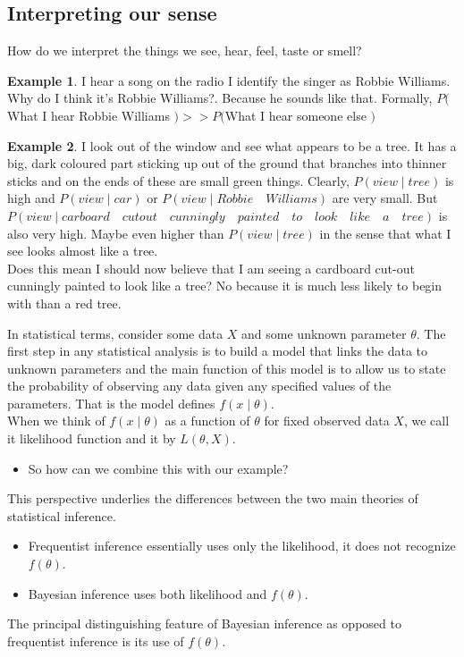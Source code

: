 \documentclass[lecture,12pt,]{pcms-l}
\numberwithin{section}{chapter}
\numberwithin{equation}{chapter}
\theoremstyle{plain}
\theoremstyle{definition}
\newtheorem{example}{Example}[section]
\theoremstyle{definition}
\begin{document}
\subsection{Interpreting our sense} 
How do we interpret the things we see, hear, feel, taste or smell?
\begin{example}
I hear a song on the radio I identify the singer as Robbie Williams. Why do I think it's Robbie Williams?. Because he sounds like that. Formally, $P($ What I hear Robbie Williams $)>>P($What I hear someone else $)$
\end{example}
\begin{example}
I look out of the window and see what appears to be a tree. It has a big, dark coloured part sticking up out of the ground that branches into thinner sticks and on the ends of these are small green things. Clearly, $P(view \mid  tree)$ is high and $P(view \mid car)$ or $P(view \mid Robbie \quad Williams)$ are very small. But $P(view \mid carboard \quad cutout \quad cunningly \quad painted \quad to \quad look \quad like \quad a \quad tree)$ is also very high. Maybe even higher than $P(view \mid  tree)$ in the sense that what I see looks almost like a tree.
\\
Does this mean I should now believe that I am seeing a cardboard cut-out cunningly painted to look like a tree? No because it is much less likely to begin with than a red tree.
\end{example}
In statistical terms, consider some data $X$ and some unknown parameter $\theta$. The first step in any statistical analysis is to build a model that links the data to unknown parameters and the main function of this model is to allow us to state the probability of observing any data given any specified values of the parameters. That is the model defines $f(x\mid \theta)$. 
\\
When we think of $f(x\mid \theta)$ as a function of $\theta$ for fixed observed data $X$, we call it likelihood function and it by $L(\theta,X)$.
\begin{itemize}
\item So how can we combine this with our example?
\end{itemize}
This perspective underlies the differences between the two main theories of statistical inference.
\begin{itemize}
\item Frequentist inference essentially uses only the likelihood, it does not recognize $f(\theta)$.
\item Bayesian inference uses both likelihood and $f(\theta)$.
\end{itemize}
The principal distinguishing feature of Bayesian inference as opposed to frequentist inference is its use of $f(\theta)$.
\end{document}
